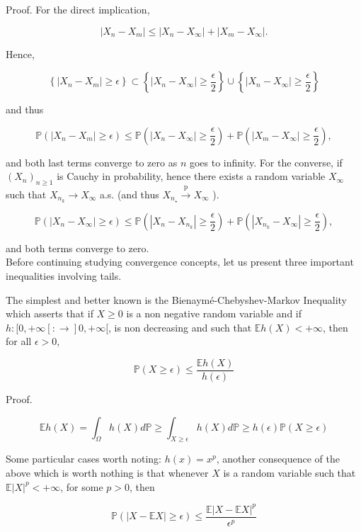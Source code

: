 \documentclass[11pt]{amsbook}
\theoremstyle{plain}%
\theoremstyle{definition}
\theoremstyle{remark}
\begin{document}
Proof. For the direct implication,

$$
\left|X_{n}-X_{m}\right| \leq\left|X_{n}-X_{\infty}\right|+\left|X_{m}-X_{\infty}\right| .
$$

Hence,

$$
\left\{\left|X_{n}-X_{m}\right| \geq \epsilon\right\} \subset\left\{\left|X_{n}-X_{\infty}\right| \geq \frac{\epsilon}{2}\right\} \cup\left\{\left|X_{n}-X_{\infty}\right| \geq \frac{\epsilon}{2}\right\}
$$

and thus

$$
\mathbb{P}\left(\left|X_{n}-X_{m}\right| \geq \epsilon\right) \leq \mathbb{P}\left(\left|X_{n}-X_{\infty}\right| \geq \frac{\epsilon}{2}\right)+\mathbb{P}\left(\left|X_{m}-X_{\infty}\right| \geq \frac{\epsilon}{2}\right),
$$

and both last terms converge to zero as $n$ goes to infinity. For the converse, if $\left(X_{n}\right)_{n \geq 1}$ is Cauchy in probability, hence there exists a random variable $X_{\infty}$ such that $X_{n_{k}} \rightarrow X_{\infty}$ a.s. (and thus $X_{n_{\star}} \xrightarrow{\mathrm{p}} X_{\infty}$ ).

$$
\mathbb{P}\left(\left|X_{n}-X_{\infty}\right| \geq \epsilon\right) \leq \mathbb{P}\left(\left|X_{n}-X_{n_{k}}\right| \geq \frac{\epsilon}{2}\right)+\mathbb{P}\left(\left|X_{n_{k}}-X_{\infty}\right| \geq \frac{\epsilon}{2}\right),
$$

and both terms converge to zero.\\
Before continuing studying convergence concepts, let us present three important inequalities involving tails.

The simplest and better known is the Bienaymé-Chebyshev-Markov Inequality which asserts that if $X \geq 0$ is a non negative random variable and if $h:[0,+\infty[: \rightarrow] 0,+\infty[$, is non decreasing and such that $\mathbb{E} h(X)<+\infty$, then for all $\epsilon>0$,

$$
\mathbb{P}(X \geq \epsilon) \leq \frac{\mathbb{E} h(X)}{h(\epsilon)}
$$

Proof.

$$
\mathbb{E} h(X)=\int_{\Omega} h(X) d \mathbb{P} \geq \int_{X \geq \epsilon} h(X) d \mathbb{P} \geq h(\epsilon) \mathbb{P}(X \geq \epsilon)
$$

Some particular cases worth noting: $h(x)=x^{p}$, another consequence of the above which is worth nothing is that whenever $X$ is a random variable such that $\mathbb{E}|X|^{p}<+\infty$, for some $p>0$, then

$$
\mathbb{P}(|X-\mathbb{E} X| \geq \epsilon) \leq \frac{\mathbb{E}|X-\mathbb{E} X|^{p}}{\epsilon^{p}}
$$
\end{document}
